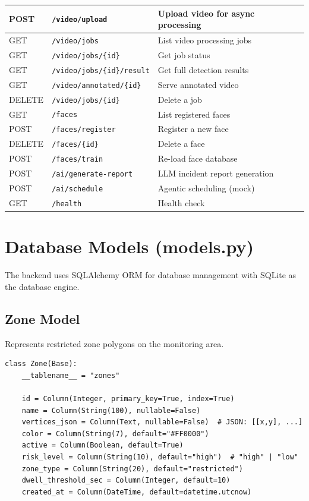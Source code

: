 \documentclass[12pt,a4paper,oneside]{book}
\begin{document}
\begin{longtable}{|l|l|p{8cm}|}
    \hline
    POST & \texttt{/video/upload} & Upload video for async processing \\
    \hline
    GET & \texttt{/video/jobs} & List video processing jobs \\
    \hline
    GET & \texttt{/video/jobs/\{id\}} & Get job status \\
    \hline
    GET & \texttt{/video/jobs/\{id\}/result} & Get full detection results \\
    \hline
    GET & \texttt{/video/annotated/\{id\}} & Serve annotated video \\
    \hline
    DELETE & \texttt{/video/jobs/\{id\}} & Delete a job \\
    \hline
    GET & \texttt{/faces} & List registered faces \\
    \hline
    POST & \texttt{/faces/register} & Register a new face \\
    \hline
    DELETE & \texttt{/faces/\{id\}} & Delete a face \\
    \hline
    POST & \texttt{/faces/train} & Re-load face database \\
    \hline
    POST & \texttt{/ai/generate-report} & LLM incident report generation \\
    \hline
    POST & \texttt{/ai/schedule} & Agentic scheduling (mock) \\
    \hline
    GET & \texttt{/health} & Health check \\
    \hline
\end{longtable}

\section{Database Models (models.py)}

The backend uses SQLAlchemy ORM for database management with SQLite as the database engine.

\subsection{Zone Model}

Represents restricted zone polygons on the monitoring area.

\begin{lstlisting}[style=pythonstyle]
class Zone(Base):
    __tablename__ = "zones"

    id = Column(Integer, primary_key=True, index=True)
    name = Column(String(100), nullable=False)
    vertices_json = Column(Text, nullable=False)  # JSON: [[x,y], ...]
    color = Column(String(7), default="#FF0000")
    active = Column(Boolean, default=True)
    risk_level = Column(String(10), default="high")  # "high" | "low"
    zone_type = Column(String(20), default="restricted")
    dwell_threshold_sec = Column(Integer, default=10)
    created_at = Column(DateTime, default=datetime.utcnow)
\end{lstlisting}
\end{document}
